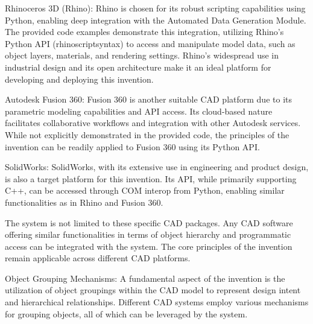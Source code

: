 \documentclass{article}
\begin{document}
Rhinoceros 3D (Rhino): Rhino is chosen for its robust scripting capabilities using Python, enabling deep integration with the Automated Data Generation Module. The provided code examples demonstrate this integration, utilizing Rhino's Python API (rhinoscriptsyntax) to access and manipulate model data, such as object layers, materials, and rendering settings. Rhino’s widespread use in industrial design and its open architecture make it an ideal platform for developing and deploying this invention.

Autodesk Fusion 360: Fusion 360 is another suitable CAD platform due to its parametric modeling capabilities and API access. Its cloud-based nature facilitates collaborative workflows and integration with other Autodesk services. While not explicitly demonstrated in the provided code, the principles of the invention can be readily applied to Fusion 360 using its Python API.

SolidWorks: SolidWorks, with its extensive use in engineering and product design, is also a target platform for this invention. Its API, while primarily supporting C++, can be accessed through COM interop from Python, enabling similar functionalities as in Rhino and Fusion 360.

The system is not limited to these specific CAD packages. Any CAD software offering similar functionalities in terms of object hierarchy and programmatic access can be integrated with the system. The core principles of the invention remain applicable across different CAD platforms.

Object Grouping Mechanisms: A fundamental aspect of the invention is the utilization of object groupings within the CAD model to represent design intent and hierarchical relationships. Different CAD systems employ various mechanisms for grouping objects, all of which can be leveraged by the system.
\end{document}
